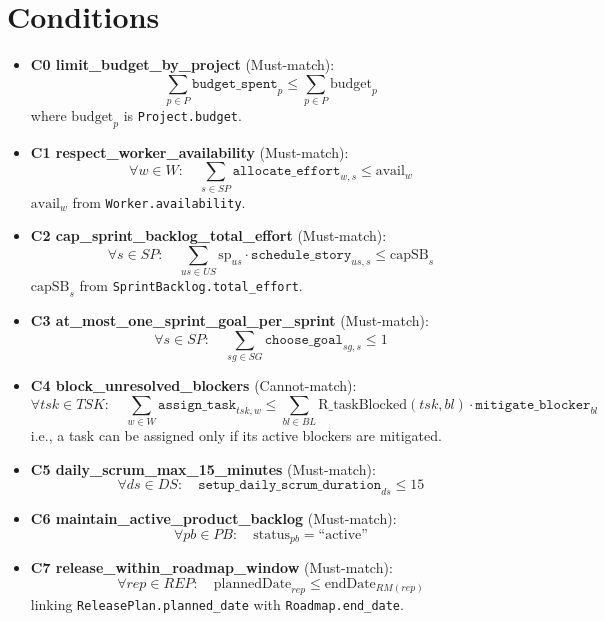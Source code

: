 \documentclass[11pt,a4paper]{article}
\begin{document}
\section{Conditions}
\begin{itemize}[leftmargin=2em]
  \item \textbf{C0 limit\_budget\_by\_project} (Must-match): 
  \[
    \sum_{p\in P} \texttt{budget\_spent}_{p} \le \sum_{p\in P} \text{budget}_{p}
  \]
  where $\text{budget}_{p}$ is \texttt{Project.budget}.
  
  \item \textbf{C1 respect\_worker\_availability} (Must-match):
  \[
    \forall w\in W:\quad \sum_{s\in SP} \texttt{allocate\_effort}_{w,s} \le \text{avail}_{w}
  \]
  $\text{avail}_{w}$ from \texttt{Worker.availability}.
  
  \item \textbf{C2 cap\_sprint\_backlog\_total\_effort} (Must-match):
  \[
    \forall s\in SP:\quad \sum_{us\in US} \text{sp}_{us}\cdot \texttt{schedule\_story}_{us,s} \le \text{capSB}_{s}
  \]
  $\text{capSB}_{s}$ from \texttt{SprintBacklog.total\_effort}.
  
  \item \textbf{C3 at\_most\_one\_sprint\_goal\_per\_sprint} (Must-match):
  \[
    \forall s\in SP:\quad \sum_{sg\in SG} \texttt{choose\_goal}_{sg,s} \le 1
  \]
  
  \item \textbf{C4 block\_unresolved\_blockers} (Cannot-match):
  \[
    \forall tsk\in TSK:\quad \sum_{w\in W}\texttt{assign\_task}_{tsk,w} \le \sum_{bl\in BL} \text{R\_taskBlocked}(tsk,bl)\cdot \texttt{mitigate\_blocker}_{bl}
  \]
  i.e., a task can be assigned only if its active blockers are mitigated.
  
  \item \textbf{C5 daily\_scrum\_max\_15\_minutes} (Must-match):
  \[
    \forall ds\in DS:\quad \texttt{setup\_daily\_scrum\_duration}_{ds} \le 15
  \]
  
  \item \textbf{C6 maintain\_active\_product\_backlog} (Must-match):
  \[
    \forall pb\in PB:\quad \text{status}_{pb}=\text{``active''}
  \]
  
  \item \textbf{C7 release\_within\_roadmap\_window} (Must-match):
  \[
    \forall rep\in REP:\quad \text{plannedDate}_{rep} \le \text{endDate}_{RM(rep)}
  \]
  linking \texttt{ReleasePlan.planned\_date} with \texttt{Roadmap.end\_date}.
  

\end{itemize}
\end{document}
